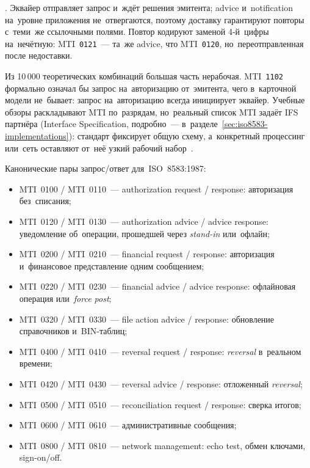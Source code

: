 .
Эквайер отправляет запрос и~ждёт решения эмитента; advice и~notification
на~уровне приложения не~отвергаются, поэтому доставку гарантируют повторы
с~теми~же ссылочными полями. Повтор кодируют заменой 4\nobreakdash-й~цифры на~нечётную:
MTI~\texttt{0121}~--- та~же advice, что MTI~\texttt{0120}, но~переотправленная
после недоставки.

Из 10\,000 теоретических комбинаций большая часть нерабочая.
MTI~\texttt{1102} формально означал бы запрос на~авторизацию от~эмитента, чего
в~карточной модели не~бывает: запрос на~авторизацию всегда инициирует эквайер.
Учебные обзоры раскладывают MTI по~разрядам, но~реальный список MTI задаёт IFS
партнёра (Interface Specification, подробно~---
в~разделе~\ref{sec:iso8583-implementations}): стандарт фиксирует общую схему,
а~конкретный процессинг или~сеть оставляют от~неё узкий рабочий
набор~\cite{iso-8583-2023,fis-iso8583-guide-2023}.

Канонические пары запрос/ответ для~ISO~8583:1987:

\begin{itemize}
  \item MTI~0100 / MTI~0110~--- authorization request / response: авторизация
    без~списания;
  \item MTI~0120 / MTI~0130~--- authorization advice / advice response:
    уведомление об~операции, прошедшей через \textit{stand-in} или~офлайн;
  \item MTI~0200 / MTI~0210~--- financial request / response: авторизация
    и~финансовое представление одним сообщением;
  \item MTI~0220 / MTI~0230~--- financial advice / advice response: офлайновая
    операция или~\textit{force post};
  \item MTI~0320 / MTI~0330~--- file action advice / response: обновление
    справочников и~BIN-таблиц;
  \item MTI~0400 / MTI~0410~--- reversal request / response: \textit{reversal} в~реальном
    времени;
  \item MTI~0420 / MTI~0430~--- reversal advice / response: отложенный \textit{reversal};
  \item MTI~0500 / MTI~0510~--- reconciliation request / response: сверка
    итогов;
  \item MTI~0600 / MTI~0610~--- административные сообщения;
  \item MTI~0800 / MTI~0810~--- network management: echo test, обмен ключами,
    sign-on/off.
\end{itemize}

